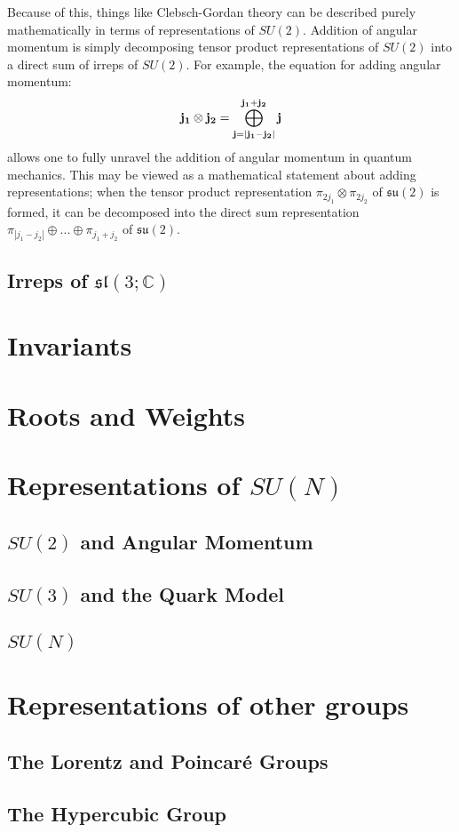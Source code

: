 \documentclass[11pt, oneside]{article}   	%
\theoremstyle{definition}
\begin{document}
Because of this, things like Clebsch-Gordan theory can be described purely mathematically in terms of representations 
of $SU(2)$. Addition of angular momentum is simply decomposing tensor product representations of $SU(2)$ into a 
direct sum of irreps of $SU(2)$. For example, the equation for adding angular momentum:
\begin{equation}
	\bf{j_1}\otimes j_2 = \bigoplus_{j = |j_1 - j_2|}^{j_1 + j_2} j
\end{equation}
allows one to fully unravel the addition of angular momentum in quantum mechanics. This may be viewed as a mathematical 
statement about adding representations; when the tensor product representation $\pi_{2j_1}\otimes\pi_{2j_2}$ of $\mathfrak{su}(2)$ 
is formed, it can be decomposed into the direct sum representation $\pi_{|j_1 - j_2|}\oplus ...\oplus\pi_{j_1 + j_2}$ of $\mathfrak{su}(2)$. 

\subsection{Irreps of $\mathfrak{sl}(3; \mathbb C)$}

\section{Invariants}

\section{Roots and Weights}

\section{Representations of $SU(N)$}

\subsection{$SU(2)$ and Angular Momentum}

\subsection{$SU(3)$ and the Quark Model}

\subsection{$SU(N)$}

\section{Representations of other groups}

\subsection{The Lorentz and Poincar\'{e} Groups}

\subsection{The Hypercubic Group}
\end{document}
